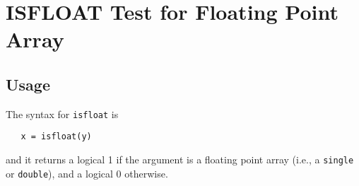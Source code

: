 \section{ISFLOAT Test for Floating Point Array}

\subsection{Usage}

The syntax for \verb|isfloat| is
\begin{verbatim}
   x = isfloat(y)
\end{verbatim}
and it returns a logical 1 if the argument is a floating 
point array (i.e., a \verb|single| or \verb|double|), and a logical
0 otherwise.
